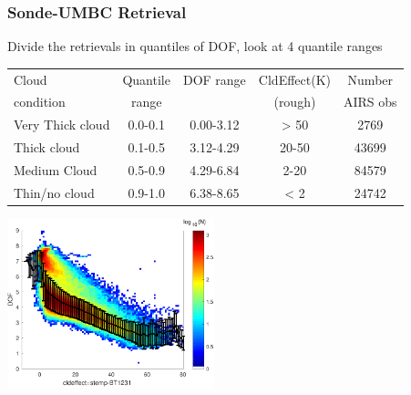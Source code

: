 \documentclass[10pt,t]{beamer}
\begin{document}
\begin{frame}
  \frametitle{Sonde-UMBC Retrieval}
  Divide the retrievals in quantiles of DOF, look at 4 quantile ranges\\

  \begin{small}
    \begin{table}[h]
      \begin{center}
        \begin{tabular}{lcccc}
          \hline
          Cloud     & Quantile & DOF range & CldEffect(K) &  Number \\
          condition & range    &           & (rough)      & AIRS obs \\
          \hline
          Very Thick cloud & 0.0-0.1 & 0.00-3.12 & > 50  & 2769 \\
          Thick cloud      & 0.1-0.5 & 3.12-4.29 & 20-50 & 43699 \\
          Medium Cloud     & 0.5-0.9 & 4.29-6.84 & 2-20  & 84579 \\
          Thin/no cloud    & 0.9-1.0 & 6.38-8.65 & < 2 & 24742 \\
          \hline
        \end{tabular}
      \end{center}
    \end{table}
  \end{small}

  \begin{center}
    \noindent\includegraphics[width=0.45\textwidth]{Figs/FigsRetr/AIRS_STM_Apr18/dofs_vs_cldeffect_iSondeList_5_iStemp_ColWV_4_xvers_5_iSubset_1_dofALL.pdf}
  \end{center}
\end{frame}
\end{document}
